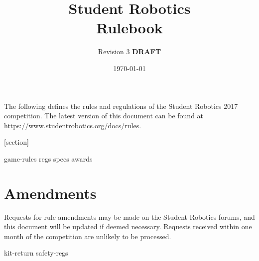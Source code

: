 \documentclass[a4paper, 11pt]{scrartcl}
\title {Student Robotics \sryear\\ Rulebook}
\author{Revision 3 \textbf{DRAFT}}
\date{\today}
\newcommand{\sryear}{2017}
\begin{document}
\maketitle

\noindent The following defines the rules and regulations of the Student Robotics \sryear {} competition.  The latest version of this document can be found at \url{https://www.studentrobotics.org/docs/rules}.

[section]
\newcommand{\rcn}{\stepcounter{rule}\arabic{section}.\arabic{rule}}
\renewcommand{\labelenumi}{\rcn}

 {game-rules}
\newpage
 {regs}
\newpage
 {specs}
\newpage
 {awards}

\renewcommand{\labelenumi}{\rcn}

\section{Amendments}
Requests for rule amendments may be made on the Student Robotics forums, and this document will be updated if deemed necessary.  Requests received within one month of the competition are unlikely to be processed.

\newpage
\appendix
\appendixpage
\addappheadtotoc
 {kit-return}
 {safety-regs}
\end{document}

